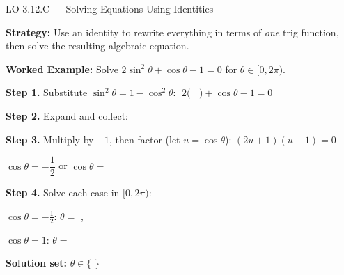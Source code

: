 \documentclass[10pt]{article}
\begin{document}
\begin{notesbox}{LO 3.12.C --- Solving Equations Using Identities}

\textbf{Strategy:} Use an identity to rewrite everything in terms of \emph{one}
trig function, then solve the resulting algebraic equation.

\vspace{6pt}
\textbf{Worked Example:} Solve $2\sin^2\theta + \cos\theta - 1 = 0$ for $\theta \in [0, 2\pi)$.

\vspace{4pt}
\textbf{Step 1.} Substitute $\sin^2\theta = 1 - \cos^2\theta$:
$\;2(\;$  $\;) + \cos\theta - 1 = 0$

\vspace{4pt}
\textbf{Step 2.} Expand and collect:

\vspace{4pt}
\textbf{Step 3.} Multiply by $-1$, then factor (let $u = \cos\theta$):
$(2u + 1)(u - 1) = 0$

\vspace{4pt}
$\cos\theta = -\dfrac{1}{2}$ \quad or \quad $\cos\theta = $ 

\vspace{4pt}
\textbf{Step 4.} Solve each case in $[0, 2\pi)$:

\vspace{2pt}
$\cos\theta = -\tfrac{1}{2}$: \quad $\theta = $ , 

\vspace{4pt}
$\cos\theta = 1$: \quad $\theta = $ 

\vspace{6pt}
\textbf{Solution set:} $\theta \in \big\{$  $\big\}$

\end{notesbox}

\vspace{0.08in}
\end{document}
